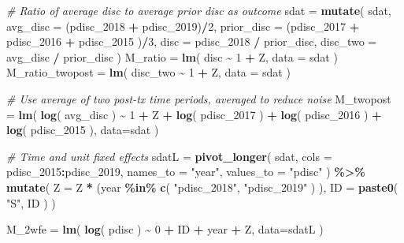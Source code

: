 \documentclass[
]{book}
\newenvironment{Shaded}{\begin{snugshade}}{\end{snugshade}}
\newcommand{\AttributeTok}[1]{\textcolor[rgb]{0.13,0.29,0.53}{#1}}
\newcommand{\CommentTok}[1]{\textcolor[rgb]{0.56,0.35,0.01}{\textit{#1}}}
\newcommand{\DecValTok}[1]{\textcolor[rgb]{0.00,0.00,0.81}{#1}}
\newcommand{\FunctionTok}[1]{\textcolor[rgb]{0.13,0.29,0.53}{\textbf{#1}}}
\newcommand{\NormalTok}[1]{#1}
\newcommand{\OtherTok}[1]{\textcolor[rgb]{0.56,0.35,0.01}{#1}}
\newcommand{\SpecialCharTok}[1]{\textcolor[rgb]{0.81,0.36,0.00}{\textbf{#1}}}
\newcommand{\StringTok}[1]{\textcolor[rgb]{0.31,0.60,0.02}{#1}}
\begin{document}
\begin{Shaded}
\begin{Highlighting}[]
    \CommentTok{\# Ratio of average disc to average prior disc as outcome}
\NormalTok{    sdat }\OtherTok{=} \FunctionTok{mutate}\NormalTok{( sdat,}
                   \AttributeTok{avg\_disc =}\NormalTok{ (pdisc\_2018 }\SpecialCharTok{+}\NormalTok{ pdisc\_2019)}\SpecialCharTok{/}\DecValTok{2}\NormalTok{,}
                   \AttributeTok{prior\_disc =}\NormalTok{ (pdisc\_2017 }\SpecialCharTok{+}\NormalTok{ pdisc\_2016 }\SpecialCharTok{+}\NormalTok{ pdisc\_2015 )}\SpecialCharTok{/}\DecValTok{3}\NormalTok{,}
                   \AttributeTok{disc =}\NormalTok{ pdisc\_2018 }\SpecialCharTok{/}\NormalTok{ prior\_disc,}
                   \AttributeTok{disc\_two =}\NormalTok{ avg\_disc }\SpecialCharTok{/}\NormalTok{ prior\_disc )}
\NormalTok{    M\_ratio }\OtherTok{=} \FunctionTok{lm}\NormalTok{( disc }\SpecialCharTok{\textasciitilde{}} \DecValTok{1} \SpecialCharTok{+}\NormalTok{ Z, }\AttributeTok{data =}\NormalTok{ sdat )}
\NormalTok{    M\_ratio\_twopost }\OtherTok{=} \FunctionTok{lm}\NormalTok{( disc\_two }\SpecialCharTok{\textasciitilde{}} \DecValTok{1} \SpecialCharTok{+}\NormalTok{ Z, }\AttributeTok{data =}\NormalTok{ sdat )}
    
    \CommentTok{\# Use average of two post{-}tx time periods, averaged to reduce noise}
\NormalTok{    M\_twopost }\OtherTok{=} \FunctionTok{lm}\NormalTok{( }\FunctionTok{log}\NormalTok{( avg\_disc ) }\SpecialCharTok{\textasciitilde{}} \DecValTok{1} \SpecialCharTok{+}\NormalTok{ Z }\SpecialCharTok{+} \FunctionTok{log}\NormalTok{( pdisc\_2017 ) }\SpecialCharTok{+} \FunctionTok{log}\NormalTok{( pdisc\_2016 ) }\SpecialCharTok{+} \FunctionTok{log}\NormalTok{( pdisc\_2015 ), }\AttributeTok{data=}\NormalTok{sdat )}

    \CommentTok{\# Time and unit fixed effects}
\NormalTok{    sdatL }\OtherTok{=} \FunctionTok{pivot\_longer}\NormalTok{( sdat, }\AttributeTok{cols =}\NormalTok{ pdisc\_2015}\SpecialCharTok{:}\NormalTok{pdisc\_2019, }
                          \AttributeTok{names\_to =} \StringTok{"year"}\NormalTok{,}
                          \AttributeTok{values\_to =} \StringTok{"pdisc"}\NormalTok{ ) }\SpecialCharTok{\%\textgreater{}\%}
        \FunctionTok{mutate}\NormalTok{( }\AttributeTok{Z =}\NormalTok{ Z }\SpecialCharTok{*}\NormalTok{ (year }\SpecialCharTok{\%in\%} \FunctionTok{c}\NormalTok{( }\StringTok{"pdisc\_2018"}\NormalTok{, }\StringTok{"pdisc\_2019"}\NormalTok{ ) ),}
                \AttributeTok{ID =} \FunctionTok{paste0}\NormalTok{( }\StringTok{"S"}\NormalTok{, ID ) )}
    
\NormalTok{    M\_2wfe }\OtherTok{=} \FunctionTok{lm}\NormalTok{( }\FunctionTok{log}\NormalTok{( pdisc ) }\SpecialCharTok{\textasciitilde{}} \DecValTok{0} \SpecialCharTok{+}\NormalTok{ ID }\SpecialCharTok{+}\NormalTok{ year }\SpecialCharTok{+}\NormalTok{ Z,}
                 \AttributeTok{data=}\NormalTok{sdatL )}


\end{Highlighting}
\end{Shaded}
\end{document}
